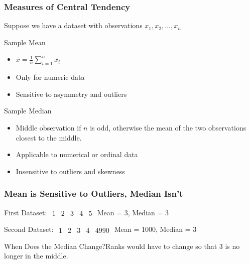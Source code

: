 \begin{frame}
\frametitle{Measures of Central Tendency}
Suppose we have a dataset with observations $x_1, x_2, \hdots, x_n$
	\begin{block}{Sample Mean}
		\begin{itemize}
			\item $\displaystyle\bar{x} = \frac{1}{n} \sum_{i=1}^n x_i$
			\item Only for numeric data
			\item Sensitive to asymmetry and outliers
		\end{itemize}
	\end{block}\pause
	\begin{block}{Sample Median}
		\begin{itemize}
		\item Middle observation if $n$ is odd, otherwise the mean of the two observations closest to the middle.
		\item Applicable to numerical or ordinal data
		\item Insensitive to outliers and skewness
		\end{itemize}
	\end{block}
\end{frame}
\begin{frame}
\frametitle{Mean is Sensitive to Outliers, Median Isn't}

\begin{block}{First Dataset: $\begin{array}{ccccc}1& 2& 3& 4& 5\end{array}$}
Mean = 3, Median = 3
\end{block}
\pause

\begin{block}{Second Dataset: $\begin{array}{ccccc}1& 2& 3& 4& 4990\end{array}$}
Mean = 1000, Median = 3
\end{block}
\pause
\begin{alertblock}{When Does the Median Change?}Ranks would have to change so that 3 is no longer in the middle.\end{alertblock}

\end{frame}
